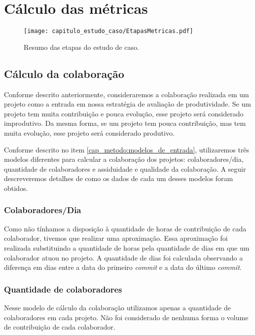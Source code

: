 


\section{Cálculo das métricas}


  \begin{figure}[H]
  \centering
  \texttt{[image: capitulo\_estudo\_caso/EtapasMetricas.pdf]} 
  \caption{Resumo das etapas do estudo de caso. }
  \label{fig:cap_metodo_resumo_etapas_metricas} 
\end{figure}


\subsection{Cálculo da colaboração}

Conforme descrito anteriormente, consideraremos a colaboração realizada em um projeto como a entrada em nossa estratégia de avaliação de produtividade. Se um projeto tem muita contribuição e pouca evolução, esse projeto será considerado improdutivo. Da mesma forma, se um projeto tem pouca contribuição, mas tem muita evolução, esse projeto será considerado produtivo. 


Conforme descrito no item \ref{cap_metodo:modelos_de_entrada}, utilizaremos três modelos diferentes para calcular a colaboração dos projetos: colaboradores/dia, quantidade de colaboradores e assiduidade e qualidade da colaboração.  A seguir descreveremos detalhes de como os dados de cada um desses modelos foram obtidos.

\subsubsection{Colaboradores/Dia}

Como não tínhamos a disposição à quantidade de horas de contribuição de cada colaborador, tivemos que realizar uma aproximação. Essa aproximação foi realizada substituindo a quantidade de horas pela quantidade de dias em que um colaborador atuou no projeto. A quantidade de dias foi calculada observando a diferença em dias entre a data do primeiro \textit{commit} e a data do último \textit{commit}.

\subsubsection{Quantidade de colaboradores}

Nesse modelo de cálculo da colaboração utilizamos apenas a quantidade de colaboradores em cada projeto. Não foi considerado de nenhuma forma o volume de contribuição de cada colaborador. 

